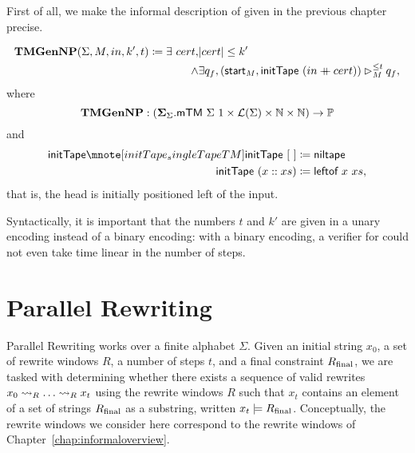 First of all, we make the informal description of \gennp{} given in the previous chapter precise.
\begin{definition}[TMGenNP][SingleTMGenNP]\label{def:tmgennp}
  \begin{align*}
    \textbf{TMGenNP}{} (\Sigma, M,  in, k', t) \coloneqq \exists~cert, &|cert| \le k' \\
    \land &\exists q_f, ({\textsf{start}}_M, \textsf{initTape}~(in \mathbin{+\mkern-10mu+} cert)) \rhd_M^{\le t} q_f, 
  \end{align*}
  where 
  \[\textbf{TMGenNP}{} : (\bm{\Sigma}_{{\Sigma}}. \textsf{mTM}~\Sigma~1 \times \mathcal{L} (\Sigma) \times \mathbb{N} \times \mathbb{N}) \rightarrow \mathbb{P} \]
  and 
  \begin{align*}
    \mnotec[initTape_singleTapeTM]{\textsf{initTape}}~\nil &\defeq \textsf{niltape} \\
    \textsf{initTape}~(x::xs) &\defeq \textsf{leftof}~x~xs,
  \end{align*}
  that is, the head is initially positioned left of the input.
\end{definition}

Syntactically, it is important that the numbers $t$ and $k'$ are given in a unary encoding instead of a binary encoding: with a binary encoding, a verifier for \gennp{} could not even take time linear in the number of steps. 

\section{Parallel Rewriting}\label{sec:pr}
Parallel Rewriting works over a finite alphabet $\Sigma$. Given an initial string $x_0$, a set of rewrite windows $R$, a number of steps $t$, and a final constraint $R_{\text{final}}$, we are tasked with determining whether there exists a sequence of valid rewrites $x_0 \rightsquigarrow_{R} \ldots \rightsquigarrow_{R} x_t$ using the rewrite windows $R$ such that $x_t$ contains an element of a set of strings $R_{\text{final}}$ as a substring, written $x_t \models R_{\text{final}}$. Conceptually, the rewrite windows we consider here correspond to the rewrite windows of Chapter~\ref{chap:informaloverview}.

